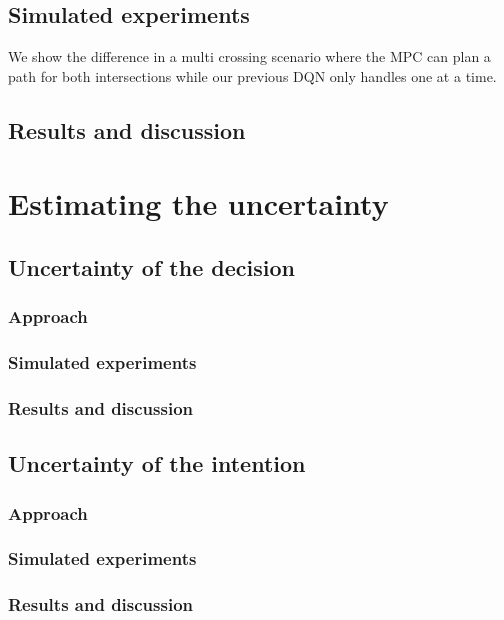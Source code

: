 \section{Simulated experiments}
We show the difference in a multi crossing scenario where the MPC can plan a path for both intersections while our previous DQN only handles one at a time. 

\section{Results and discussion}

\chapter{Estimating the uncertainty}

\section{Uncertainty of the decision}
\subsection{Approach}
\subsection{Simulated experiments}
\subsection{Results and discussion}

\section{Uncertainty of the intention}
\subsection{Approach}
\subsection{Simulated experiments}
\subsection{Results and discussion}


